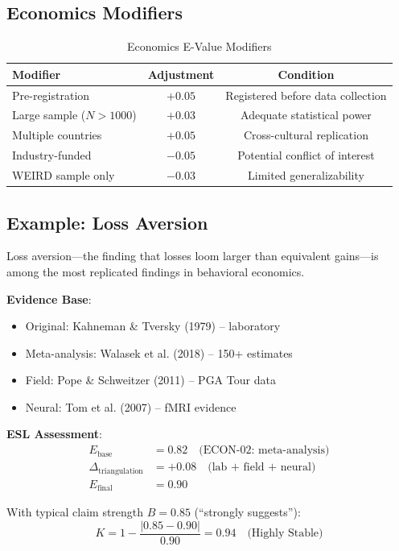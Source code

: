 \documentclass[11pt,a4paper]{article}
\theoremstyle{remark}
\begin{document}
\subsection{Economics Modifiers}

\begin{table}[h]
\centering
\caption{Economics E-Value Modifiers}
\label{tab:econ-modifiers}
\begin{tabular}{lcc}
\toprule
\textbf{Modifier} & \textbf{Adjustment} & \textbf{Condition} \\
\midrule
Pre-registration & $+0.05$ & Registered before data collection \\
Large sample ($N > 1000$) & $+0.03$ & Adequate statistical power \\
Multiple countries & $+0.05$ & Cross-cultural replication \\
Industry-funded & $-0.05$ & Potential conflict of interest \\
WEIRD sample only & $-0.03$ & Limited generalizability \\
\bottomrule
\end{tabular}
\end{table}

\subsection{Example: Loss Aversion}

\begin{examplebox}[title={Loss Aversion ($\lambda \approx 2.0$--$2.5$)}]
Loss aversion---the finding that losses loom larger than equivalent gains---is among the most replicated findings in behavioral economics.

\textbf{Evidence Base}:
\begin{itemize}
    \item Original: Kahneman \& Tversky (1979) -- laboratory
    \item Meta-analysis: Walasek et al. (2018) -- 150+ estimates
    \item Field: Pope \& Schweitzer (2011) -- PGA Tour data
    \item Neural: Tom et al. (2007) -- fMRI evidence
\end{itemize}

\textbf{ESL Assessment}:
\begin{align}
E_{\text{base}} &= 0.82 \quad \text{(ECON-02: meta-analysis)} \\
\Delta_{\text{triangulation}} &= +0.08 \quad \text{(lab + field + neural)} \\
E_{\text{final}} &= 0.90
\end{align}

With typical claim strength $B = 0.85$ (``strongly suggests''):
\begin{equation}
K = 1 - \frac{|0.85 - 0.90|}{0.90} = 0.94 \quad \text{(Highly Stable)}
\end{equation}
\end{examplebox}
\end{document}
